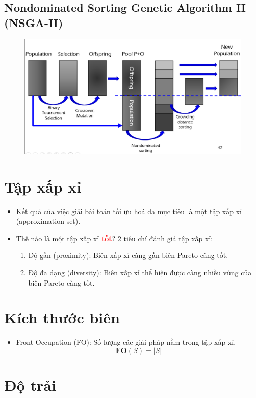 \documentclass{book}
\begin{document}
\subsection{Nondominated Sorting Genetic Algorithm II (NSGA-II)}
\begin{figure}[H]
    \centering
    \includegraphics[width=0.75\linewidth]{images/GA-7-8_42.png}
\end{figure}

\section*{Tập xấp xỉ}

\begin{itemize}
    \item Kết quả của việc giải bài toán tối ưu hoá đa mục tiêu là một tập xấp xỉ (approximation set).
    \item Thế nào là một tập xấp xỉ \textcolor{red}{\textbf{tốt}}?
    2 tiêu chí đánh giá tập xấp xỉ:
    \begin{enumerate}
        \item Độ gần (proximity): Biên xấp xỉ càng gần biên Pareto càng tốt.
        \item Độ đa dạng (diversity): Biên xấp xỉ thể hiện được càng nhiều vùng của biên Pareto càng tốt.
    \end{enumerate}
\end{itemize}

\section*{Kích thước biên}

\begin{itemize}
    \item Front Occupation (FO): Số lượng các giải pháp nằm trong tập xấp xỉ.
    \[ \mathbf{FO}(S) = |S| \]
\end{itemize}

\section*{Độ trải}
\end{document}
